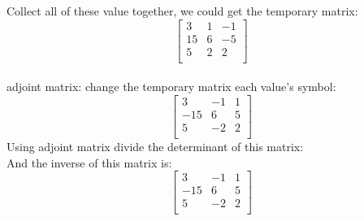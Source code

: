 \documentclass[a4paper,12pt]{article} %
\begin{document}
\noindent
Collect all of these value together, we could get the temporary matrix: \\
\[
\begin{bmatrix}
    3 & 1 & -1 \\
    15 & 6 & -5 \\
    5 & 2 & 2 \\
\end{bmatrix}
\]
\\
\noindent
adjoint matrix: change the temporary matrix each value's symbol: \\
\[
\begin{bmatrix}
    3 & -1 & 1 \\
    -15 & 6 & 5 \\
    5 & -2 & 2 \\
\end{bmatrix}
\]
Using adjoint matrix divide the determinant of this matrix: \\
And the inverse of this matrix is: \\
\[
\begin{bmatrix}
    3 & -1 & 1 \\
    -15 & 6 & 5 \\
    5 & -2 & 2 \\
\end{bmatrix}
\]
\\
\end{document}
